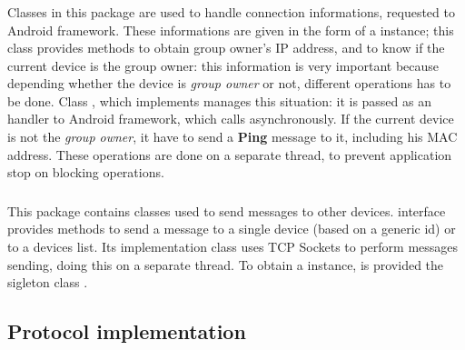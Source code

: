 	\subsubsection{}
	Classes in this package are used to handle connection informations, requested to Android \direct framework. These informations are given in the form of a  instance; this class provides methods to obtain group owner's IP address, and to know if the current device is the group owner: this information is very important because depending whether the device is \textit{group owner} or not, different operations has to be done. Class , which implements  manages this situation: it is passed as an handler to Android \direct framework, which calls  asynchronously. 
	If the current device is not the \textit{group owner}, it have to send a \textbf{Ping} message to it, including his MAC address.
	These operations are done on a separate thread, to prevent application stop on blocking operations.
	\\
	\subsubsection{}
	This package contains classes used to send messages to other devices.  interface provides methods to send a message to a single device (based on a generic  id) or to a devices list. Its implementation class  uses TCP Sockets to perform messages sending, doing this on a separate thread. To obtain a  instance, is provided the sigleton class .

\subsection{Protocol implementation}

